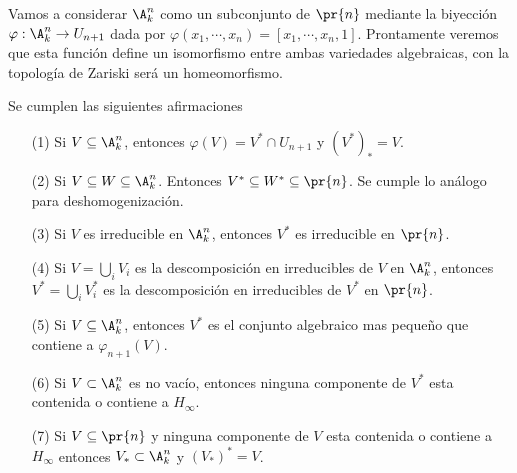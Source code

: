 \documentclass{article}
\begin{document}
\vspace{2mm}
\noindent Vamos a considerar $\A^{n}_{k}$ como un subconjunto de $\pr{n}$ mediante la biyección 
$\varphi:\A^{n}_{k}\to U_{n+1}$ dada por $\varphi(x_{1},\cdots,x_{n})=[x_{1},\cdots,x_{n},1]$. 
Prontamente veremos que esta función define un isomorfismo entre ambas variedades algebraicas,
con la topología de Zariski será un homeomorfismo.
\begin{prop}
    Se cumplen las siguientes afirmaciones
    \begin{itemize}
        \item[(1)] Si $V\subseteq\A^{n}_{k}$, entonces $\varphi(V)=V^{*}\cap U_{n+1}$ y 
        $(V^{*})_{*}=V$.

        \item[(2)] Si $V\subseteq W\subseteq\A^{n}_{k}$. Entonces $V^{*}\subseteq W^{*}
        \subseteq\pr{n}$. Se cumple lo análogo para deshomogenización.

        \item[(3)] Si $V$ es irreducible en $\A^{n}_{k}$, entonces $V^{*}$ es irreducible en 
        $\pr{n}$.

        \item[(4)] Si $V=\bigcup_{i}V_{i}$ es la descomposición en irreducibles de $V$ en 
        $\A^{n}_{k}$, entonces $V^{*}=\bigcup_{i}V^{*}_{i}$ es la descomposición en irreducibles 
        de $V^{*}$ en $\pr{n}$.

        \item[(5)] Si $V\subseteq\A^{n}_{k}$, entonces $V^{*}$ es el conjunto algebraico mas 
        pequeño que contiene a $\varphi_{n+1}(V)$.

        \item[(6)] Si $V\subset\A^{n}_{k}$ es no vacío, entonces ninguna componente de $V^{*}$
        esta contenida o contiene a $H_{\infty}$.

        \item[(7)] Si $V\subseteq\pr{n}$ y ninguna componente de $V$ esta contenida o contiene a 
        $H_{\infty}$ entonces $V_{*}\subset\A^{n}_{k}$ y $(V_{*})^{*}=V$.
    \end{itemize}
\end{prop}
\end{document}
